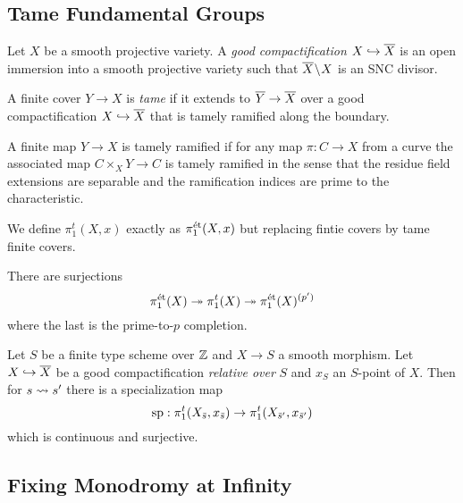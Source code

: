 \documentclass[12pt]{article}
\begin{document}
\subsection{Tame Fundamental Groups} 

\begin{defn}
Let $X$ be a smooth projective variety. A \textit{good compactification} $X \embed \ol{X}$ is an open immersion into a smooth projective variety such that $\ol{X} \sm X$ is an SNC divisor. 
\end{defn}

\begin{defn}
A finite \etale cover $Y \to X$ is \textit{tame} if it extends to $\ol{Y} \to \ol{X}$ over a good compactification $X \embed \ol{X}$ that is tamely ramified along the boundary.
\end{defn}

\begin{defn}
A finite map $Y \to X$ is tamely ramified if for any map $\pi : C \to X$ from a curve the associated map $C \times_X Y \to C$ is tamely ramified in the sense that the residue field extensions are separable and the ramification indices are prime to the characteristic. 
\end{defn}

\begin{defn}
We define $\pi_1^t(X, x)$ exactly as $\pi_1^{\et}(X, x)$ but replacing fintie \etale covers by tame finite \etale covers. 
\end{defn}


\begin{rmk}
There are surjections
\[ \pi_1^{\et}(X) \onto \pi_1^t(X) \onto \pi_1^{\et}(X)^{(p')} \]
where the last is the prime-to-$p$ completion.
\end{rmk}

\begin{theorem}
Let $S$ be a finite type scheme over $\Z$ and $X \to S$ a smooth morphism. Let $X \embed \ol{X}$ be a good compactification \textit{relative over} $S$ and $x_S$ an $S$-point of $X$. Then for $s \spto s'$ there is a specialization map
\[ \sp : \pi_1^t(X_{\bar{s}}, x_{\bar{s}}) \to \pi_1^t(X_{\bar{s}'}, x_{\bar{s}'}) \]
which is continuous and surjective.
\end{theorem}

\subsection{Fixing Monodromy at Infinity}
\end{document}
